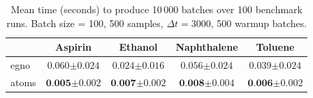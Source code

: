 \begin{table}[ht]
    \centering
    \caption{Mean time (seconds) to produce 10\,000 batches over 100 benchmark runs. Batch size = 100, 500 samples, \(\Delta t = 3000\), 500 warmup batches.}
    \label{tab:dataloader_perf}
    \begin{tabular}{lcccc}
        \toprule
         & Aspirin & Ethanol & Naphthalene & Toluene \\
         \midrule
         \gls{egno} & \(0.060{\scriptstyle \pm0.024}\) & \(0.024{\scriptstyle \pm0.016}\) & \(0.056{\scriptstyle \pm0.024}\) & \(0.039{\scriptstyle \pm0.024}\) \\
         \gls{atoms} & \(\textbf{0.005}{\scriptstyle \pm0.002}\) & \(\textbf{0.007}{\scriptstyle \pm0.002}\) & \(\textbf{0.008}{\scriptstyle \pm0.004}\) & \(\textbf{0.006}{\scriptstyle \pm0.002}\) \\
         \bottomrule
    \end{tabular}
\end{table}

\newpage
